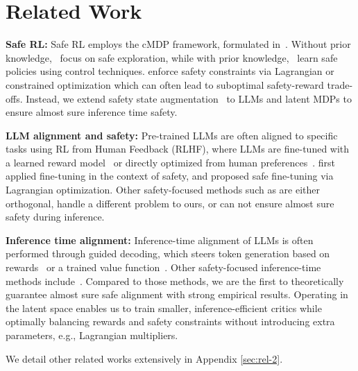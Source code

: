 \section{Related Work}
\textbf{Safe RL:} Safe RL employs the cMDP framework, formulated in~\citep{altman1999constrained}. Without prior knowledge,~\citep{turchetta2016safe, koller2018learning, dalal2018safe} focus on safe exploration, while with prior knowledge,~\citep{chow2018lyapunov, chow2019lyapunov, berkenkamp2017safe} learn safe policies using control techniques. \citep{achiam2017constrained, ray2019benchmarking, stooke2020responsive} enforce safety constraints via Lagrangian or constrained optimization which can often lead to suboptimal safety-reward trade-offs. Instead, we extend safety state augmentation~\cite{sootla2022saute} to LLMs and latent MDPs to ensure almost sure inference time safety.


\textbf{LLM alignment and safety:} Pre-trained LLMs are often aligned to specific tasks using RL from Human Feedback (RLHF), where LLMs are fine-tuned with a learned reward model~\citep{stiennon2020learning, ziegler2019fine, ouyang2022training} or directly optimized from human preferences~\citep{rafailov2023direct, azar2023general, zhao2023slic, tang2024generalized, song2024preference, ethayarajh2024kto}. \citep{bai2022training, ganguli2022red} first applied fine-tuning in the context of safety, and \citep{dai2023safe} proposed safe fine-tuning via Lagrangian optimization. Other safety-focused methods such as \citep{gundavarapu2024machine,gou2024eyes,hammoud2024model,hua2024trustagent,zhang2024controllable,guo2024cold,xu2024safedecoding,wei2024assessing,li2025salora} are either orthogonal, handle a different problem to ours, or can not ensure almost sure safety during inference. 



\textbf{Inference time alignment:} Inference-time alignment of LLMs is often performed through guided decoding, which steers token generation based on rewards~\citep{khanov2024args,shi2024decoding,huang2024deal} or a trained value function~\citet{han2024value,mudgal2023controlled,kong2024aligning}. Other safety-focused inference-time methods include~\citep{zhong2024rose,banerjee2024safeinfer,niu2024parameter,wang2024probing,zeng2024root,zhao2024adversarial}. Compared to those methods, we are the first to theoretically guarantee almost sure safe alignment with strong empirical results. Operating in the latent space enables us to train smaller, inference-efficient critics while optimally balancing rewards and safety constraints without introducing extra parameters, e.g., Lagrangian multipliers.

We detail other related
works extensively in Appendix \ref{sec:rel-2}.